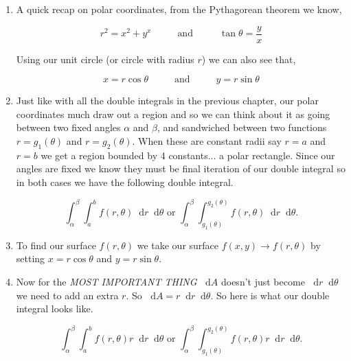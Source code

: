 \documentclass[11pt]{article}
\newcommand*\dif{\mathop{}\!\mathrm{d}}
\begin{document}
\begin{enumerate}
\item A quick recap on polar coordinates, from the Pythagorean theorem we know,

\begin{equation*}
    r^2 = x^2 + y^x \hspace{1cm} \text{ and } \hspace{1cm} \tan{\theta} = \frac{y}{x} 
\end{equation*}

Using our unit circle (or circle with radius $r$) we can also see that,

\begin{equation*}
    x = r\cos{\theta}\hspace{1cm} \text{  and  }\hspace{1cm} y = r\sin{\theta}
\end{equation*}


\item Just like with all the double integrals in the previous chapter, our polar coordinates much draw out a region and so we can think about it as going between two fixed angles $\alpha$ and $\beta$, and sandwiched between two functions $r = g_1(\theta)$ and $r = g_2(\theta)$. When these are constant radii say $r=a$ and $r=b$ we get a region bounded by 4 constants... a polar rectangle. Since our angles are fixed we know they must be final iteration of our double integral so in both cases we have the following double integral.

\begin{equation*}
    \int_{\alpha}^{\beta} \int_{a}^{b} f(r,\theta) \dif{r} \dif{\theta} \text{ or } \int_{ \alpha}^{\beta} \int_{g_1(\theta)}^{g_2(\theta)} f(r,\theta) \dif{r} \dif{\theta}.
\end{equation*}

\item To find our surface $f(r,\theta)$ we take our surface $f(x,y) \to f(r,\theta)$ by setting $x=r\cos{\theta}$ and $y=r\sin{\theta}$.




\item Now for the \emph{MOST IMPORTANT THING} $\dif{A}$ doesn't just become $\dif{r}\dif{\theta}$ we need to add an extra $r$. So $\dif{A} =r \dif{r}\dif{\theta}$. So here is what our double integral looks like.

\begin{equation*}
    \int_{\alpha}^{\beta} \int_{a}^{b} f(r,\theta) r \dif{r} \dif{\theta} \text{ or } \int_{ \alpha}^{\beta} \int_{g_1(\theta)}^{g_2(\theta)} f(r,\theta) r \dif{r} \dif{\theta}.
\end{equation*}



\end{enumerate}
\end{document}
